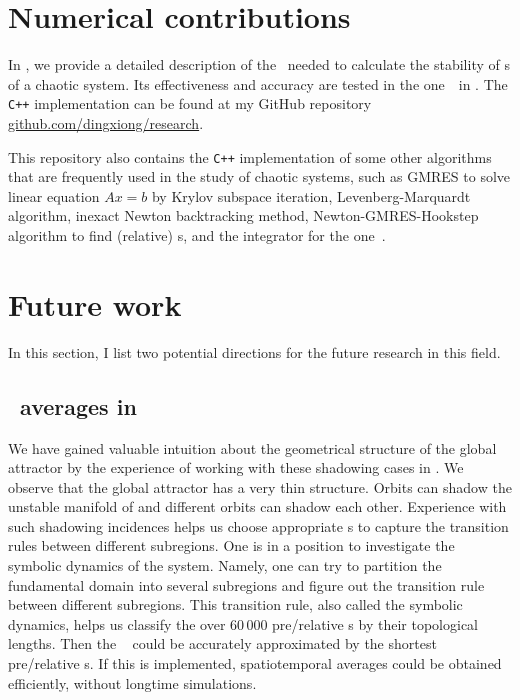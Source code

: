 

\section{Numerical contributions}

In ,
we provide a detailed description of the \ped\ needed to calculate the stability
of \po s of a chaotic system. Its effectiveness and accuracy are
tested in the one\dmn\ \KSe\ in .
The \texttt{C++}
implementation can be found at my GitHub repository
\href{https://github.com/dingxiong/research}
{github.com/dingxiong/research}.

This repository also contains the \texttt{C++} implementation of some
other algorithms that are frequently used in the study of chaotic systems,
such as GMRES to solve linear equation $Ax=b$ by Krylov
subspace iteration,
Levenberg-Marquardt algorithm,
inexact Newton backtracking method,
Newton-GMRES-Hookstep algorithm to find (relative)
\po s, and the integrator for the one\dmn\ \KSe.

\section{Future work}

In this section, I list two potential directions for
the future research in this field.

\subsection{\Spt\ averages in \KSe}

We have gained valuable intuition about the geometrical structure of
the global attractor by the experience of working with these shadowing
cases in . We observe that the global attractor
has a very thin structure. Orbits can shadow the unstable manifold of
 and different orbits
can shadow each other. Experience with such shadowing incidences helps us
choose appropriate  \PoincSec s to capture the
transition rules between different subregions.
One is in a position to investigate the symbolic
dynamics of the system. Namely, one can try to partition the fundamental
domain into several subregions and figure out the transition rule
between different subregions. This transition rule, also called the symbolic
dynamics, helps us classify the over $60\,000$ pre/relative \po s by
their topological lengths. Then the \Fd\ 
could be accurately approximated by the shortest pre/relative
\po s.
If this is implemented, spatiotemporal averages could be obtained efficiently,
without longtime simulations.


